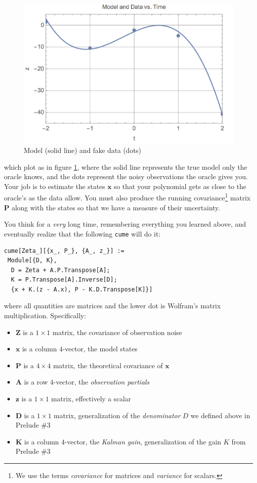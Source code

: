 \documentclass[10pt,oneside,x11names]{article}
\begin{document}
\begin{figure}[htb]
\centering
\includegraphics[width=.9\linewidth]{small_example.png}
\caption{\label{fig:orgparagraph1}
Model (solid line) and fake data (dots)}
\end{figure}

\noindent which plot as in figure \ref{fig:orgparagraph1}, where the solid line
represents the true model only the oracle knows, and the dots represent the
noisy observations the oracle gives you. Your job is to estimate the states
\(\mathbold{x}\) so that your polynomial gets as close to the oracle's as the data
allow. You must also produce the running covariance\footnote{We use the terms \emph{covariance} for matrices and \emph{variance} for scalars.} matrix
\(\mathbold{P}\) along with the states so that we have a measure of their
uncertainty.

You think for a \emph{very} long time, remembering everything you learned above, and
eventually realize that the following \texttt{cume} will do it:

\begin{verbatim}
cume[Zeta_][{x_, P_}, {A_, z_}] :=
 Module[{D, K},
  D = Zeta + A.P.Transpose[A];
  K = P.Transpose[A].Inverse[D];
  {x + K.(z - A.x), P - K.D.Transpose[K]}]
\end{verbatim}

\noindent where all quantities are matrices and the lower dot is Wolfram's matrix
multiplication.  Specifically:

\begin{itemize}
\item \(\mathbold{Z}\) is a \(1\times{1}\) matrix, the covariance of
observation noise
\item \(\mathbold{x}\) is a column \(4\)-vector, the model states
\item \(\mathbold{P}\) is a \(4\times{4}\) matrix, the theoretical
covariance of \(\mathbold{x}\)
\item \(\mathbold{A}\) is a row \(4\)-vector, the \emph{observation partials}
\item \(\mathbold{z}\) is a \({1}\times{1}\) matrix, effectively a scalar
\item \(\mathbold{D}\) is a \({1}\times{1}\) matrix, generalization of the
\emph{denominator} \(D\) we defined above in Prelude \#3
\item \(\mathbold{K}\) is a column \(4\)-vector, the \emph{Kalman gain}, generalization of the
gain \(K\) from Prelude \#3
\end{itemize}
\end{document}
